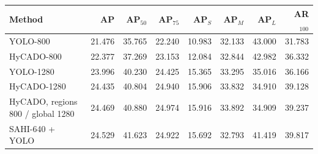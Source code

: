\begin{tabular}{lrrrrrrr}
\toprule
Method & AP & AP$_{50}$ & AP$_{75}$ & AP$_S$ & AP$_M$ & AP$_L$ & AR$_{100}$\\
\midrule
YOLO-800 & 21.476 & 35.765 & 22.240 & 10.983 & 32.133 & 43.000 & 31.783\\
HyCADO-800 & 22.377 & 37.269 & 23.153 & 12.084 & 32.844 & 42.982 & 36.332\\
YOLO-1280 & 23.996 & 40.230 & 24.425 & 15.365 & 33.295 & 35.016 & 36.166\\
HyCADO-1280 & 24.435 & 40.804 & 24.940 & 15.906 & 33.832 & 34.910 & 39.128\\
HyCADO, regions 800 / global 1280 & 24.469 & 40.880 & 24.974 & 15.916 & 33.892 & 34.909 & 39.237\\
SAHI-640 + YOLO & 24.529 & 41.623 & 24.922 & 15.692 & 32.793 & 41.419 & 39.817\\
\bottomrule
\end{tabular}
